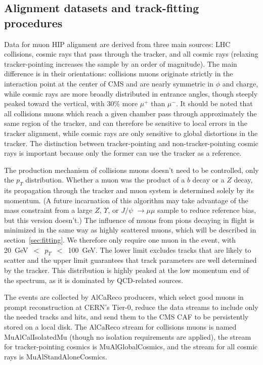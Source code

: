 \documentclass[12pt]{article}
\begin{document}
\subsection{Alignment datasets and track-fitting procedures}

Data for muon HIP alignment are derived from three main sources: LHC
collisions, cosmic rays that pass through the tracker, and all cosmic
rays (relaxing tracker-pointing increases the sample by an order of
magnitude).  The main difference is in their orientations: collisions
muons originate strictly in the interaction point at the center of CMS
and are nearly symmetric in $\phi$ and charge, while cosmic rays are
more broadly distributed in entrance angles, though steeply peaked
toward the vertical, with 30\% more $\mu^+$ than $\mu^-$.  It should
be noted that all collisions muons which reach a given chamber pass
through approximately the same region of the tracker, and can
therefore be sensitive to local errors in the tracker alignment, while
cosmic rays are only sensitive to global distortions in the tracker.
The distinction between tracker-pointing and non-tracker-pointing
cosmic rays is important because only the former can use the tracker
as a reference.

The production mechanism of collisions muons doesn't need to be
controlled, only the $p_T$ distribution.  Whether a muon was the
product of a $b$ decay or a $Z$ decay, its propagation through the
tracker and muon system is determined solely by its momentum.  (A
future incarnation of this algorithm may take advantage of the mass
constraint from a large $Z$, $\Upsilon$, or $J/\psi$ $\to\mu\mu$ sample to reduce reference bias,
but this version doesn't.)  The influence of muons from pions decaying
in flight is minimized in the same way as highly scattered muons,
which will be described in section~\ref{sec:fitting}.  We therefore only
require one muon in the event, with 20~GeV~$<$~$p_T$~$<$~100~GeV.  The
lower limit excludes tracks that are likely to scatter and the upper
limit guarantees that track parameters are well determined by the
tracker.  This distribution is highly peaked at the low momentum end
of the spectrum, as it is dominated by QCD-related sources.

The events are collected by AlCaReco producers, which select good
muons in prompt reconstruction at CERN's Tier-0, reduce the data
streams to include only the needed tracks and hits, and send them to
the CMS CAF to be persistently stored on a local disk.  The AlCaReco
stream for collisions muons is named MuAlCalIsolatedMu (though no
isolation requirements are applied), the stream for tracker-pointing
cosmics is MuAlGlobalCosmics, and the stream for all cosmic rays is
MuAlStandAloneCosmics.\label{page:AlCaReco}
\end{document}
